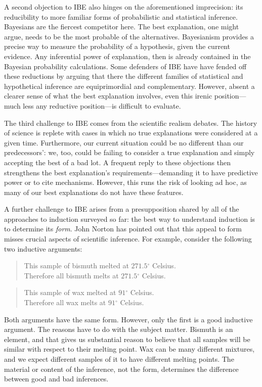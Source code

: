 \documentclass{article}[11pt]
\renewcommand{\degree}{\ensuremath{^\circ}}
\begin{document}
A second objection to IBE also hinges on the aforementioned imprecision: its reducibility to more familiar forms of probabilistic and statistical inference.  Bayesians are the fiercest competitor here.  The best explanation, one might argue, needs to be the most probable of the alternatives.  Bayesianism provides a precise way to measure the probability of a hypothesis, given the current evidence.  Any inferential power of explanation, then is already contained in the Bayesian probability calculations.  Some defenders of IBE have have fended off these reductions by arguing that there the different families of statistical and hypothetical inference are equiprimordial and complementary. However, absent a clearer sense of what the best explanation involves, even this irenic position---much less any reductive position---is difficult to evaluate.

The third challenge to IBE comes from the scientific realism debates. The history of science is replete with cases in which no true explanations were considered at a given time. Furthermore, our current situation could be no different than our predecessors': we, too, could be failing to consider a true explanation and simply accepting the best of a bad lot. A frequent reply to these objections then strengthens the best explanation's requirements---demanding it to have predictive power or to cite mechanisms. However, this runs the risk of looking ad hoc, as many of our best explanations do not have these features.

A further challenge to IBE arises from a presupposition shared by all of the approaches to induction surveyed so far: the best way to understand induction is to determine its \textit{form}. John Norton \parencite*{Norton2003,Norton2007} has pointed out that this appeal to form misses crucial aspects of scientific inference.  For example, consider the following two inductive arguments:

\begin{quote} 
This sample of bismuth melted at $271.5\degree$ Celsius. \\[-6pt] 
Therefore all bismuth melts at $271.5\degree$ Celsius.
\end{quote}

\begin{quote}
This sample of wax melted at $91\degree$ Celsius. \\[-6pt]
Therefore all wax melts at $91\degree$ Celsius.
\end{quote}

\noindent Both arguments have the same form. However, only the first is a good inductive argument.  The reasons have to do with the subject matter.  Bismuth is an element, and that gives us substantial reason to believe that all samples will be similar with respect to their melting point.  Wax can be many different mixtures, and we expect different samples of it to have different melting points.  The material or content of the inference, not the form, determines the difference between good and bad inferences.
\end{document}
